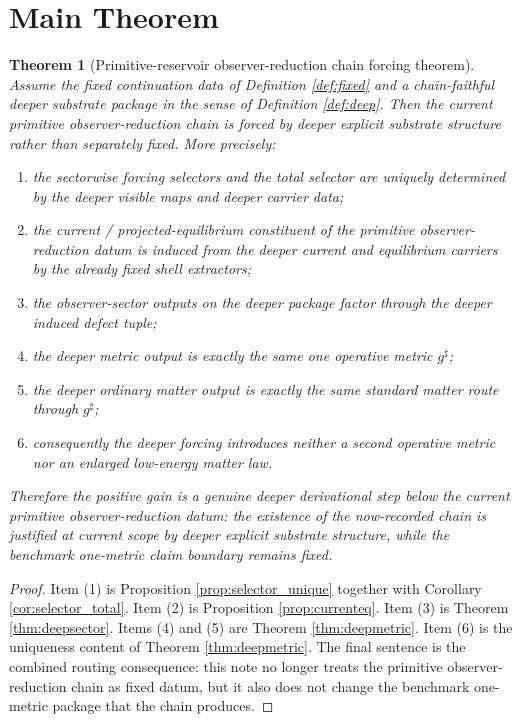 \documentclass[11pt]{article}
\newcommand{\CompletedMetric}{g^{\sharp}}
\newtheorem{theorem}{Theorem}
\begin{document}
\section{Main Theorem}

\begin{theorem}[Primitive-reservoir observer-reduction chain forcing theorem]
\label{thm:main}
Assume the fixed continuation data of Definition \ref{def:fixed} and a chain-faithful deeper substrate package in the sense of Definition \ref{def:deep}. Then the current primitive observer-reduction chain is forced by deeper explicit substrate structure rather than separately fixed. More precisely:
\begin{enumerate}
    \item the sectorwise forcing selectors and the total selector are uniquely determined by the deeper visible maps and deeper carrier data;
    \item the current / projected-equilibrium constituent of the primitive observer-reduction datum is induced from the deeper current and equilibrium carriers by the already fixed shell extractors;
    \item the observer-sector outputs on the deeper package factor through the deeper induced defect tuple;
    \item the deeper metric output is exactly the same one operative metric \(\CompletedMetric\);
    \item the deeper ordinary matter output is exactly the same standard matter route through \(\CompletedMetric\);
    \item consequently the deeper forcing introduces neither a second operative metric nor an enlarged low-energy matter law.
\end{enumerate}
Therefore the positive gain is a genuine deeper derivational step below the current primitive observer-reduction datum: the existence of the now-recorded chain is justified at current scope by deeper explicit substrate structure, while the benchmark one-metric claim boundary remains fixed.
\end{theorem}

\begin{proof}
Item (1) is Proposition \ref{prop:selector_unique} together with Corollary \ref{cor:selector_total}. Item (2) is Proposition \ref{prop:currenteq}. Item (3) is Theorem \ref{thm:deepsector}. Items (4) and (5) are Theorem \ref{thm:deepmetric}. Item (6) is the uniqueness content of Theorem \ref{thm:deepmetric}. The final sentence is the combined routing consequence: this note no longer treats the primitive observer-reduction chain as fixed datum, but it also does not change the benchmark one-metric package that the chain produces.
\end{proof}
\end{document}
